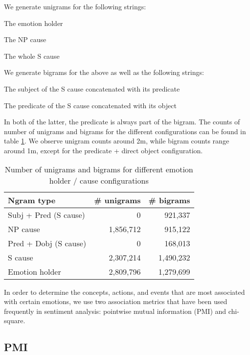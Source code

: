We generate unigrams for the following strings:
\begin{aenumerate}
	\item The emotion holder
	\item The NP cause
	\item The whole S cause
\end{aenumerate}

We generate bigrams for the above as well as the following strings:
\begin{aenumerate}
	\item The subject of the S cause concatenated with its predicate
	\item The predicate of the S cause concatenated with its object
\end{aenumerate}

In both of the latter, the predicate is always part of the bigram. The counts of number of unigrams and bigrams for the different configurations can be found in table \ref{tab:unigram_bigram_count_ngram_type}. We observe unigram counts around 2m, while bigram counts range around 1m, except for the predicate + direct object configuration.

\begin{table}[h]
\centering
\begin{tabular}{l|r|r}
{\bf Ngram type}      & {\bf \# unigrams} & {\bf \# bigrams} \\\hline
Subj + Pred (S cause) & 0                 & 921,337          \\
NP cause              & 1,856,712         & 915,122          \\
Pred + Dobj (S cause) & 0                 & 168,013          \\
S cause               & 2,307,214         & 1,490,232        \\
Emotion holder        & 2,809,796         & 1,279,699       
\end{tabular}
\caption{Number of unigrams and bigrams for different emotion holder / cause configurations}
\label{tab:unigram_bigram_count_ngram_type}
\end{table}

In order to determine the concepts, actions, and events that are most associated with certain emotions, we use two association metrics that have been used frequently in sentiment analysis: pointwise mutual information (PMI) and chi-square.

\subsection{PMI}

